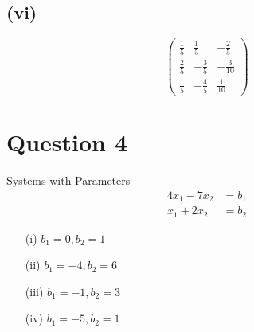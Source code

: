 \documentclass[12pt]{article}
\begin{document}
\subsection*{(vi)}
\[
\begin{pmatrix}
\frac{1}{5} & \frac{1}{5} & -\frac{2}{5}\\
\frac{2}{5} & -\frac{3}{5} & -\frac{3}{10}\\
\frac{1}{5} & -\frac{4}{5} & \frac{1}{10}
\end{pmatrix}
\]

\section*{Question 4}
Systems with Parameters
\[
\begin{aligned}
4x_1 - 7x_2 &= b_1\\
x_1 + 2x_2 &= b_2
\end{aligned}
\]

\begin{itemize}
\item[(i)] $b_1 = 0, b_2 = 1$
\item[(ii)] $b_1 = -4, b_2 = 6$
\item[(iii)] $b_1 = -1, b_2 = 3$
\item[(iv)] $b_1 = -5, b_2 = 1$
\end{itemize}
\end{document}
